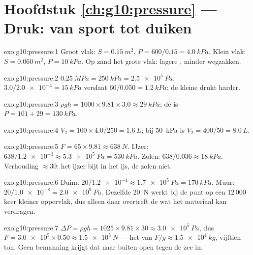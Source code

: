 \section*{Hoofdstuk \ref{ch:g10:pressure} --- Druk: van sport tot duiken}

\begin{solution}{exo:g10:pressure:1}
Groot vlak: $S = \qty{0.15}{m^2}$, $P = 600/0.15 = \qty{4.0}{kPa}$.
Klein vlak: $S = \qty{0.060}{m^2}$, $P = \qty{10}{kPa}$. Op zand het
grote vlak: lagere , minder wegzakken.
\end{solution}

\begin{solution}{exo:g10:pressure:2}
$\qty{0.25}{MPa} = \qty{250}{kPa} = \qty{2.5e5}{Pa}$.
$3.0/\num{2.0e-4} = \qty{15}{kPa}$ verslaat
$60/0.050 = \qty{1.2}{kPa}$: de kleine  drukt harder.
\end{solution}

\begin{solution}{exo:g10:pressure:3}
$\rho g h = 1000 \times 9.81 \times 3.0 \approx \qty{29}{kPa}$; de
 is $P = 101 + 29 = \qty{130}{kPa}$.
\end{solution}

\begin{solution}{exo:g10:pressure:4}
$V_2 = 100 \times 4.0 / 250 = \qty{1.6}{L}$; bij \qty{50}{kPa} is
$V_2 = 400/50 = \qty{8.0}{L}$.
\end{solution}

\begin{solution}{exo:g10:pressure:5}
$F = 65 \times 9.81 \approx \qty{638}{N}$. IJzer:
$638/\num{1.2e-3} \approx \qty{5.3e5}{Pa} = \qty{530}{kPa}$. Zolen:
$638/0.036 \approx \qty{18}{kPa}$. Verhouding $\approx 30$: het ijzer
bijt in het ijs, de zolen niet.
\end{solution}

\begin{solution}{exo:g10:pressure:6}
Duim: $20/\num{1.2e-4} \approx \qty{1.7e5}{Pa} = \qty{170}{kPa}$. Muur:
$20/\num{1.0e-8} = \qty{2.0e9}{Pa}$. Dezelfde \qty{20}{N} werkt bij de
punt op een $12\,000$ keer kleiner oppervlak, dus alleen daar overtreft
de  wat het materiaal kan verdragen.
\end{solution}

\begin{solution}{exo:g10:pressure:7}
$\Delta P = \rho g h = 1025 \times 9.81 \times 30 \approx
\qty{3.0e5}{Pa}$, dus
$F = \num{3.0e5} \times 0.50 \approx \qty{1.5e5}{N}$ --- het  van
$F/g \approx \qty{1.5e4}{kg}$, vijftien ton. Geen bemanning krijgt dat
naar buiten open tegen de zee in.
\end{solution}

